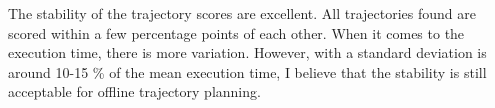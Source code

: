 The stability of the trajectory scores are excellent. All trajectories found are scored within a few percentage points of each other. When it comes to the execution time, there is more variation. However, with a standard deviation is around 10-15 \% of the mean execution time, I believe that the stability is still acceptable for offline trajectory planning.
%
%
%
%
